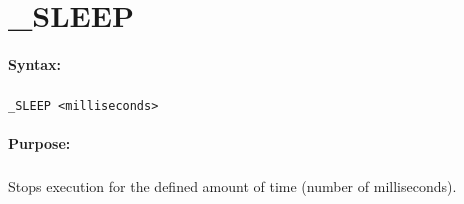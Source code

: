 
\newpage
\section{\_SLEEP}
\label{cmd:_SLEEP}

\paragraph{Syntax:}
\subparagraph{}
\texttt{\_SLEEP <milliseconds>}

\paragraph{Purpose:}
\subparagraph{}
Stops execution for the defined amount of time (number 
of milliseconds).